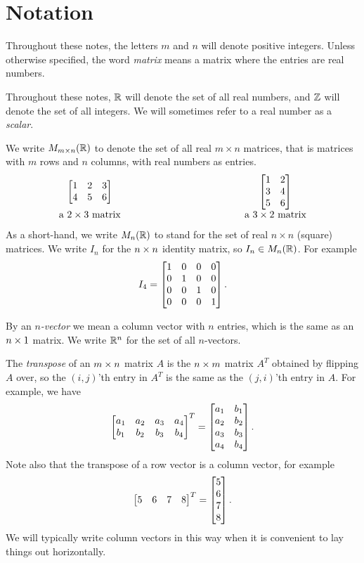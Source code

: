 \documentclass[reqno]{amsart}
\theoremstyle{definition}
\newcommand{\dfn}[1]{\emph{{#1}}\index{#1}}
\begin{document}
\section{Notation}
\label{sec-notation}

Throughout these notes, the letters $m$ and $n$ will denote positive
integers.  Unless otherwise specified, the word \dfn{matrix} means a
matrix where the entries are real numbers.

Throughout these notes, ${\mathbb{R}}$ will denote the set of all real numbers,
and ${\mathbb{Z}}$ will denote the set of all integers.  We will sometimes refer
to a real number as a \dfn{scalar}.

We write $M_{m\times n}({\mathbb{R}})$ to denote the set of all real $m\times n$
matrices, that is matrices with $m$ rows and $n$ columns, with real
numbers as entries.
\[
  \begin{array}{ccc}
   \bbm 1 & 2 & 3 \\ 4 & 5 & 6 \ebm &
   \hspace{10em} &
   \bbm 1 & 2 \\ 3 & 4 \\ 5 & 6 \ebm \\
   \text{ a $2\tm 3$ matrix } & &
   \text{ a $3\tm 2$ matrix }
  \end{array}
\]
As a short-hand, we write $M_n({\mathbb{R}})$ to stand for the set of real
$n\times n$ (square) matrices.  We write $I_n$ for the $n\times n$
identity matrix, so $I_n\in M_n({\mathbb{R}})$.  For example
\[ I_4 = \left[\begin{matrix} 1 & 0 & 0 & 0 \\ 0 & 1 & 0 & 0 \\
              0 & 0 & 1 & 0 \\ 0 & 0 & 0 & 1 \end{matrix}\right].
\]

By an \emph{$n$-vector} we mean a column vector with
$n$ entries, which is the same as an $n\times 1$ matrix.  We write ${\mathbb{R}}^n$
for the set of all $n$-vectors.

The \dfn{transpose} of an $m\times n$ matrix $A$ is the
$n\times m$ matrix $A^T$ obtained by flipping $A$ over, so the $(i,j)$'th
entry in $A^T$ is the same as the $(j,i)$'th entry in $A$.  For
example, we have
\[ \left[\begin{matrix} a_1 & a_2 & a_3 & a_4 \\ b_1 & b_2 & b_3 & b_4 \end{matrix}\right]^T =
    \left[\begin{matrix} a_1 & b_1 \\ a_2 & b_2 \\ a_3 & b_3 \\ a_4 & b_4 \end{matrix}\right].
\]
Note also that the transpose of a row vector is a column vector, for
example
\[ \left[\begin{matrix} 5 & 6 & 7 & 8 \end{matrix}\right]^T = \left[\begin{matrix} 5 \\ 6 \\ 7 \\ 8 \end{matrix}\right]. \]
We will typically write column vectors in this way when it is
convenient to lay things out horizontally.
\end{document}
